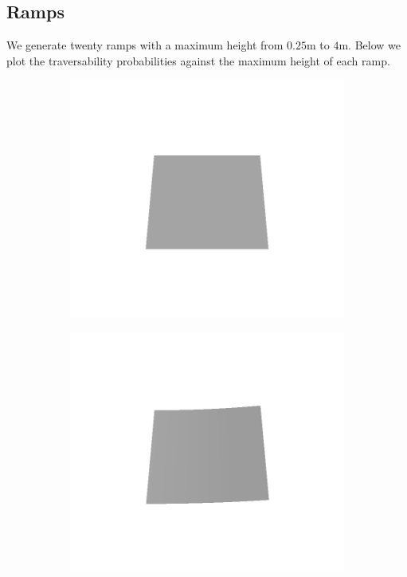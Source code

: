 \documentclass[../document.tex]{subfiles}
\begin{document}
\subsection{Ramps}
We generate twenty ramps with a maximum height from $0.25$m to $4$m. Below we plot the traversability probabilities against the maximum height of each ramp.

\begin{figure} [htbp]
    \centering
    \begin{subfigure}[b]{0.24\textwidth}
    \includegraphics[width=\linewidth]{../img/5/custom_patches/ramp/all/00-3d.png}
    \end{subfigure}
    \begin{subfigure}[b]{0.24\textwidth}
    \includegraphics[width=\linewidth]{../img/5/custom_patches/ramp/all/03-3d.png}

\end{subfigure}
\end{figure}
\end{document}
